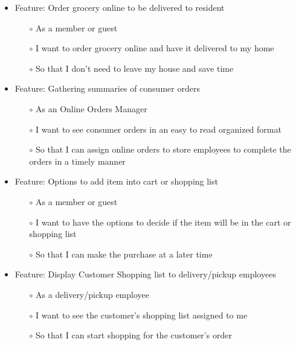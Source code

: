 \documentclass{scrreprt}
\theoremstyle{funreq}
\begin{document}
	\begin{itemize}
		\item Feature: Order grocery online to be delivered to resident 
		\begin{itemize}
			\item[$\circ$]As a member or guest 
			\item[$\circ$]I want to order grocery online and have it delivered to my home  
			\item[$\circ$]So that I don’t need to leave my house and save time 
		\end{itemize}
	\end{itemize}
	
	\begin{itemize}
		\item Feature: Gathering summaries of consumer orders
		\begin{itemize}
			\item[$\circ$]As an Online Orders Manager
			\item[$\circ$]I want to see consumer orders in an easy to read organized format
			\item[$\circ$]So that I can assign online orders to store employees to complete the orders in a timely manner
		\end{itemize}
	\end{itemize}
	
	\begin{itemize}
		\item Feature: Options to add item into cart or shopping list
		\begin{itemize}
			\item[$\circ$]As a member or guest
			\item[$\circ$]I want to have the options to decide if the item will be in the cart or shopping list
			\item[$\circ$]So that I can make the purchase at a later time
		\end{itemize}
	\end{itemize}
	
	\begin{itemize}
		\item Feature: Display Customer Shopping list to delivery/pickup employees
		\begin{itemize}
			\item[$\circ$]As a delivery/pickup employee
			\item[$\circ$]I want to see the customer’s shopping list assigned to me
			\item[$\circ$]So that I can start shopping for the customer’s order
		\end{itemize}
	\end{itemize}
	
\end{document}
